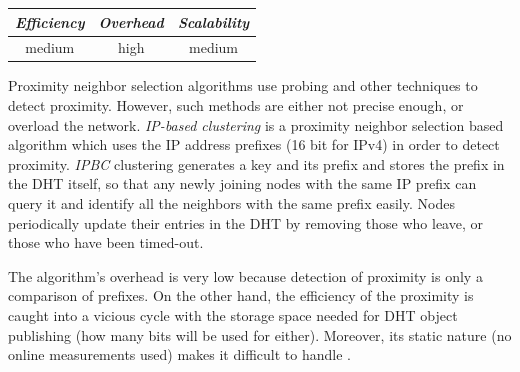 %
%
%

\begin{center}
\begin{tabular}{ccc}
\emph{Efficiency} & \emph{Overhead} & \emph{Scalability} \\
\hline
medium &
high &
medium
\end{tabular}
\end{center}

Proximity neighbor selection algorithms use probing and other techniques to
detect proximity. However, such methods are either not precise enough, or
overload the network. \emph{IP-based clustering} \cite{KM2007} is a proximity
neighbor selection based algorithm which uses the IP address prefixes (16 bit
for IPv4) in order to detect proximity. \emph{IPBC} clustering generates a key
and its prefix and stores the prefix in the DHT itself, so that any newly
joining nodes with the same IP prefix can query it and
identify all the neighbors with the same prefix easily.  Nodes
periodically update their entries in the DHT by removing those who leave, or
those who have been timed-out.

The algorithm's overhead is very low because detection of proximity is only
a comparison of prefixes. On the other hand, the efficiency of the proximity
is caught into a vicious cycle with the storage space needed for DHT object
publishing (how many bits will be used for either). Moreover, its static
nature (no online measurements used) makes it difficult to handle
\cite{EWF2011}.

